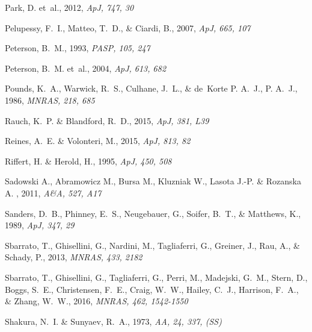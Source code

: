 \documentclass{aa}
\begin{document}
\begin{thebibliography}{}
Park, D. et~al., 2012,
\newblock \emph{ApJ, 747, 30}

Pelupessy, F.~I., Matteo, T.~D., \& Ciardi, B., 2007,
\newblock \emph{ApJ, 665, 107}

Peterson, B.~M., 1993,
\newblock \emph{PASP, 105, 247}

Peterson, B.~M. et~al., 2004,
\newblock \emph{ApJ, 613, 682}

Pounds, K.~A., Warwick, R.~S., Culhane, J.~L., \& de~Korte P. A.~J., P. A.~J., 1986,
\newblock \emph{MNRAS, 218, 685}

Rauch, K.~P. \& Blandford, R.~D., 2015,
\newblock \emph{ApJ, 381, L39}

Reines, A.~E. \& Volonteri, M., 2015,
\newblock \emph{ApJ, 813, 82}

Riffert, H. \& Herold, H., 1995,
\newblock \emph{ApJ, 450, 508}

 Sadowski A., Abramowicz M., Bursa M., Kluzniak W., Lasota J.-P. \& Rozanska A.
, 2011,
\newblock \emph{A\&A, 527, A17}

Sanders, D.~B., Phinney, E.~S., Neugebauer, G., Soifer, B.~T., \& Matthews, K., 1989,
\newblock \emph{ApJ, 347, 29}

Sbarrato, T., Ghisellini, G., Nardini, M., Tagliaferri, G., Greiner, J., Rau,
  A., \& Schady, P., 2013,
\newblock \emph{MNRAS, 433, 2182}

Sbarrato, T., Ghisellini, G., Tagliaferri, G., Perri, M., Madejski, G.~M.,
  Stern, D., Boggs, S.~E., Christensen, F.~E., Craig, W.~W., Hailey, C.~J.,
  Harrison, F.~A., \& Zhang, W.~W., 2016,
\newblock \emph{MNRAS, 462, 1542-1550}

Shakura, N.~I. \& Sunyaev, R.~A., 1973,
\newblock \emph{AA, 24, 337, (SS)}


\end{thebibliography}
\end{document}
